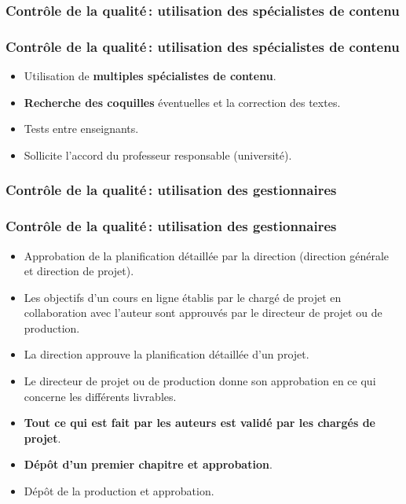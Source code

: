					\subsubsection{Contrôle de la qualité\,: utilisation des spécialistes de contenu} 
							\begin{frame}
							\frametitle{Contrôle de la qualité\,: utilisation des spécialistes de contenu}
                        			
							\begin{itemize}
							
							\item Utilisation de \textbf{multiples spécialistes de contenu}.
							\item \textbf{Recherche des coquilles} éventuelles et la correction des textes.
							\item Tests entre enseignants.
							\item Sollicite l’accord du professeur responsable (université).
							\end{itemize}						
					\end{frame}	
					
					\subsubsection{Contrôle de la qualité\,: utilisation des gestionnaires} 
							\begin{frame}
							\frametitle{Contrôle de la qualité\,: utilisation des gestionnaires}
                        			
							\begin{itemize}
							\item Approbation de la planification détaillée par la direction (direction générale et direction de projet).
							
							\item Les objectifs d’un cours en ligne établis par le chargé de projet en collaboration avec l’auteur sont approuvés par le directeur de projet ou de production.
							\item La direction approuve la planification détaillée d’un projet.
							\item Le directeur de projet ou de production donne son approbation en ce qui concerne les différents livrables.
							\item \textbf{Tout ce qui est fait par les auteurs est validé par les chargés de projet}.
							\item \textbf{Dépôt d’un premier chapitre et approbation}.
							\item Dépôt de la production et approbation.
							\end{itemize}						
					\end{frame}	
					

